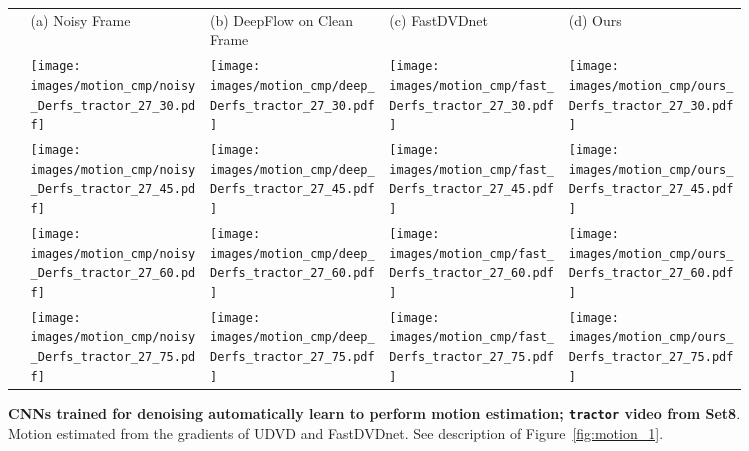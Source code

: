 \documentclass[final]{cvpr}
\begin{document}
\begin{figure*}[ht]
    \def\f1ht{\linewidth}

     \centering 
     \begin{tabular}{ >{\centering\arraybackslash}m{0.02\linewidth}
     >{\centering\arraybackslash}m{0.23\linewidth}
     >{\centering\arraybackslash}m{0.23\linewidth}
     >{\centering\arraybackslash}m{0.23\linewidth}
     >{\centering\arraybackslash}m{0.23\linewidth}
     }
     \centering
     
      & 
     \footnotesize{(a) Noisy Frame} &
     \footnotesize{(b) DeepFlow on Clean Frame} &
     \footnotesize{(c) FastDVDnet} &
     \footnotesize{(d) Ours} \\
     
     30 & \texttt{[image: images/motion\_cmp/noisy\_Derfs\_tractor\_27\_30.pdf]} &
     \texttt{[image: images/motion\_cmp/deep\_Derfs\_tractor\_27\_30.pdf]} &
     \texttt{[image: images/motion\_cmp/fast\_Derfs\_tractor\_27\_30.pdf]} &
     \texttt{[image: images/motion\_cmp/ours\_Derfs\_tractor\_27\_30.pdf]} \\
     
     45 & \texttt{[image: images/motion\_cmp/noisy\_Derfs\_tractor\_27\_45.pdf]} &
     \texttt{[image: images/motion\_cmp/deep\_Derfs\_tractor\_27\_45.pdf]} &
     \texttt{[image: images/motion\_cmp/fast\_Derfs\_tractor\_27\_45.pdf]} &
     \texttt{[image: images/motion\_cmp/ours\_Derfs\_tractor\_27\_45.pdf]} \\
     
     60 & \texttt{[image: images/motion\_cmp/noisy\_Derfs\_tractor\_27\_60.pdf]} &
     \texttt{[image: images/motion\_cmp/deep\_Derfs\_tractor\_27\_60.pdf]} &
     \texttt{[image: images/motion\_cmp/fast\_Derfs\_tractor\_27\_60.pdf]} &
     \texttt{[image: images/motion\_cmp/ours\_Derfs\_tractor\_27\_60.pdf]} \\
     
     75 & \texttt{[image: images/motion\_cmp/noisy\_Derfs\_tractor\_27\_75.pdf]} &
     \texttt{[image: images/motion\_cmp/deep\_Derfs\_tractor\_27\_75.pdf]} &
     \texttt{[image: images/motion\_cmp/fast\_Derfs\_tractor\_27\_75.pdf]} &
     \texttt{[image: images/motion\_cmp/ours\_Derfs\_tractor\_27\_75.pdf]} \\
     
     \end{tabular}
     
     \vspace{0.2cm}
     
\caption{\textbf{CNNs trained for denoising automatically learn to perform motion estimation; \texttt{tractor} video from Set8}.
Motion estimated from the gradients of UDVD and FastDVDnet. See description of Figure~\ref{fig:motion_1}.}
\label{fig:motion_3}
\end{figure*}
\end{document}
